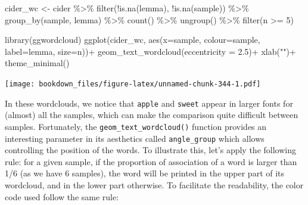 \documentclass[
]{krantz}
\makeatletter
\newenvironment{Shaded}{\begin{snugshade}}{\end{snugshade}}
\newcommand{\AttributeTok}[1]{\textcolor[rgb]{0.61,0.61,0.61}{#1}}
\newcommand{\DecValTok}[1]{\textcolor[rgb]{0.06,0.06,0.06}{#1}}
\newcommand{\FloatTok}[1]{\textcolor[rgb]{0.06,0.06,0.06}{#1}}
\newcommand{\FunctionTok}[1]{\textcolor[rgb]{0,0,0}{#1}}
\newcommand{\NormalTok}[1]{#1}
\newcommand{\OtherTok}[1]{\textcolor[rgb]{0.37,0.37,0.37}{#1}}
\newcommand{\SpecialCharTok}[1]{\textcolor[rgb]{0,0,0}{#1}}
\newcommand{\StringTok}[1]{\textcolor[rgb]{0.5,0.5,0.5}{#1}}
\newenvironment{kframe}{%
\medskip{}
\setlength{\fboxsep}{.8em}
 \def\at@end@of@kframe{}%
 \ifinner\ifhmode%
  \def\at@end@of@kframe{\end{minipage}}%
  \begin{minipage}{\columnwidth}%
 \fi\fi%
 \def\FrameCommand##1{\hskip\@totalleftmargin \hskip-\fboxsep
 \colorbox{shadecolor}{##1}\hskip-\fboxsep
     \hskip-\linewidth \hskip-\@totalleftmargin \hskip\columnwidth}%
 \MakeFramed {\advance\hsize-\width
   \@totalleftmargin\z@ \linewidth\hsize
   \@setminipage}}%
 {\par\unskip\endMakeFramed%
 \at@end@of@kframe}
\renewenvironment{Shaded}{\begin{kframe}}{\end{kframe}}
\makeatother
\begin{document}
\begin{Shaded}
\begin{Highlighting}[]
\NormalTok{cider\_wc }\OtherTok{\textless{}{-}}\NormalTok{ cider }\SpecialCharTok{\%\textgreater{}\%} 
  \FunctionTok{filter}\NormalTok{(}\SpecialCharTok{!}\FunctionTok{is.na}\NormalTok{(lemma), }\SpecialCharTok{!}\FunctionTok{is.na}\NormalTok{(sample)) }\SpecialCharTok{\%\textgreater{}\%} 
  \FunctionTok{group\_by}\NormalTok{(sample, lemma) }\SpecialCharTok{\%\textgreater{}\%} 
  \FunctionTok{count}\NormalTok{() }\SpecialCharTok{\%\textgreater{}\%} 
  \FunctionTok{ungroup}\NormalTok{() }\SpecialCharTok{\%\textgreater{}\%} 
  \FunctionTok{filter}\NormalTok{(n }\SpecialCharTok{\textgreater{}=} \DecValTok{5}\NormalTok{)}

\FunctionTok{library}\NormalTok{(ggwordcloud)}
\FunctionTok{ggplot}\NormalTok{(cider\_wc, }\FunctionTok{aes}\NormalTok{(}\AttributeTok{x=}\NormalTok{sample, }\AttributeTok{colour=}\NormalTok{sample, }\AttributeTok{label=}\NormalTok{lemma, }\AttributeTok{size=}\NormalTok{n))}\SpecialCharTok{+}
  \FunctionTok{geom\_text\_wordcloud}\NormalTok{(}\AttributeTok{eccentricity =} \FloatTok{2.5}\NormalTok{)}\SpecialCharTok{+}
  \FunctionTok{xlab}\NormalTok{(}\StringTok{""}\NormalTok{)}\SpecialCharTok{+}
  \FunctionTok{theme\_minimal}\NormalTok{()}
\end{Highlighting}
\end{Shaded}

\texttt{[image: bookdown\_files/figure-latex/unnamed-chunk-344-1.pdf]}

In these wordclouds, we notice that \texttt{apple} and \texttt{sweet} appear in larger fonts for (almost) all the samples, which can make the comparison quite difficult between samples. Fortunately, the \texttt{geom\_text\_wordcloud()} function provides an interesting parameter in its aesthetics called \texttt{angle\_group} which allows controlling the position of the words. To illustrate this, let's apply the following rule: for a given sample, if the proportion of association of a word is larger than 1/6 (as we have 6 samples), the word will be printed in the upper part of its wordcloud, and in the lower part otherwise. To facilitate the readability, the color code used follow the same rule:
\end{document}
